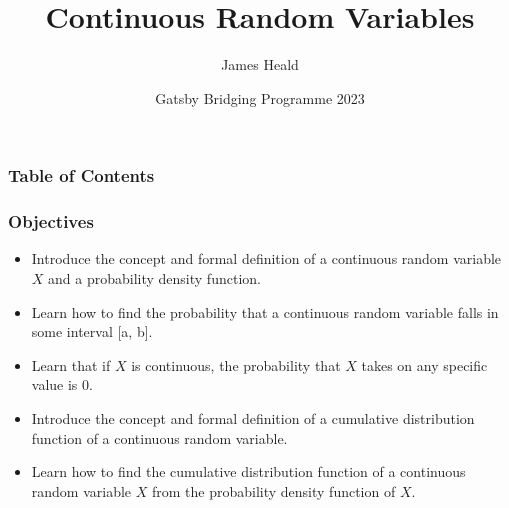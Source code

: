 \documentclass{beamer}
\title[Continuous Random Variables ]
{Continuous Random Variables\newline }
\subtitle{}
\author[James Heald] %
{James Heald\inst{1}}
\institute[UCL] %
{
  \inst{1}%
  Gatsby Computational Neuroscience Unit\\
  University College London
}
\date[Gatsby Bridging Programme  2023] %
{Gatsby Bridging Programme 2023}
\begin{document}
\frame{\titlepage}

\begin{frame}
\frametitle{Table of Contents}
\tableofcontents
\end{frame}


\begin{frame}
\frametitle{Objectives}
\begin{itemize}
    \item Introduce the concept and formal definition of a continuous random variable $X$ and a probability density function.
        \item Learn how to find the probability that a continuous random variable falls in some interval [a, b].
    \item Learn that if $X$ is continuous, the probability that $X$ takes on any specific value is 0.
    \item Introduce the concept and formal definition of a cumulative distribution function of a continuous random variable.
    \item Learn how to find the cumulative distribution function of a continuous random variable $X$ from the probability density function of $X$.
\end{itemize}
\end{frame}
\end{document}
